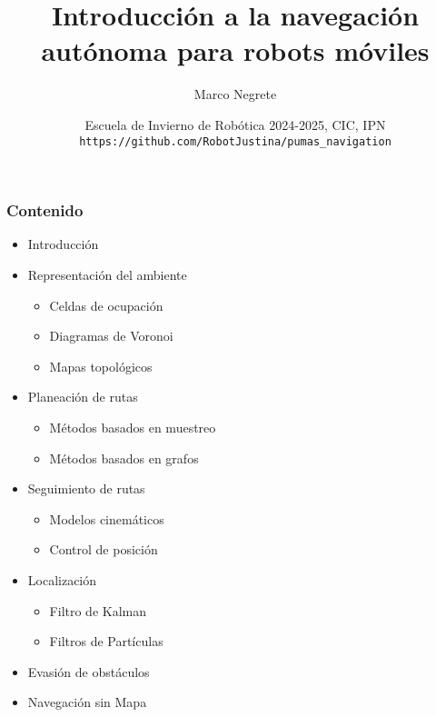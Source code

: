 \documentclass[10pt,spanish,aspectratio=1610]{beamer}
\begin{document}
\renewcommand{\tablename}{Tabla}
\renewcommand{\figurename}{Figura}

\title[Navegación Autónoma]{Introducción a la navegación autónoma para robots móviles}
\author[Marco Negrete]{Marco Negrete}
\date[EIR 2024-2025]{Escuela de Invierno de Robótica 2024-2025, CIC, IPN\\ \texttt{https://github.com/RobotJustina/pumas\_navigation}}

\begin{frame}
\titlepage
\end{frame}

\begin{frame}\frametitle{Contenido}
  \begin{itemize}
  \item Introducción
  \item Representación del ambiente
    \begin{itemize}
    \item Celdas de ocupación
    \item Diagramas de Voronoi
    \item Mapas topológicos
    \end{itemize}
  \item Planeación de rutas
    \begin{itemize}
    \item Métodos basados en muestreo
    \item Métodos basados en grafos
    \end{itemize}
  \item Seguimiento de rutas
    \begin{itemize}
    \item Modelos cinemáticos
    \item Control de posición
    \end{itemize}
  \item Localización
    \begin{itemize}
    \item Filtro de Kalman
    \item Filtros de Partículas
    \end{itemize}
  \item Evasión de obstáculos
  \item Navegación sin Mapa
  \end{itemize}
\end{frame}

%

\end{document}
